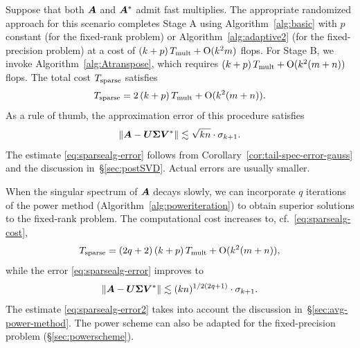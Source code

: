 \documentclass[final]{siamltex}
\begin{document}
Suppose that both $\bm{A}$ and $\bm{A}^*$ admit fast multiplies.
The appropriate randomized approach for this scenario completes
Stage A using Algorithm~\ref{alg:basic} with $p$ constant
(for the fixed-rank problem)
or Algorithm~\ref{alg:adaptive2} (for the fixed-precision problem)
at a cost of  $(k+p) \, T_{\rm mult} + \mathrm{O}(k^2 m)$ flops.
For Stage B, we invoke Algorithm~\ref{alg:Atranspose}, which
requires $(k+p) \, T_{\rm mult} + \mathrm{O}(k^2 (m + n))$ flops.
The total cost $T_{\rm sparse}$ satisfies
\begin{equation}
\label{eq:sparsealg-cost}
T_{\rm sparse} = 2\,(k + p)\, T_{\rm mult} + \bigO(k^2 (m + n)).
\end{equation}
As a rule of thumb, the approximation error of this procedure satisfies
\begin{equation}
\label{eq:sparsealg-error}
\norm{ \mtx{A} - \mtx{U\Sigma V}^\adj } \lesssim \sqrt{kn} \cdot \sigma_{k+1}.
\end{equation}
The estimate \eqref{eq:sparsealg-error} follows from Corollary~\ref{cor:tail-spec-error-gauss}
and the discussion in~\S\ref{sec:postSVD}.  Actual errors are usually smaller.

When the singular spectrum of $\bm{A}$ decays slowly,
we can incorporate $q$ iterations of the power method
(Algorithm~\ref{alg:poweriteration}) to obtain superior
solutions to the fixed-rank problem.
The computational cost increases to, cf.~\eqref{eq:sparsealg-cost},
\begin{equation}
\label{eq:sparsealg-cost2}
T_{\rm sparse} = (2q+2)\,(k + p) \, T_{\rm mult} + \bigO(k^2 (m + n)),
\end{equation}
while the error \eqref{eq:sparsealg-error} improves to
\begin{equation}
\label{eq:sparsealg-error2}
\norm{ \mtx{A} - \mtx{U\Sigma V}^\adj } \lesssim (kn)^{1/2(2q+1)} \cdot \sigma_{k+1}.
\end{equation}
The estimate \eqref{eq:sparsealg-error2}
takes into account the discussion in~\S\ref{sec:avg-power-method}.
The power scheme can also be adapted for the fixed-precision
problem (\S\ref{sec:powerscheme}).
\end{document}
